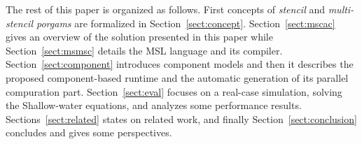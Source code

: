 The rest of this paper is organized as follows. First concepts of \emph{stencil} and \emph{multi-stencil porgams} are formalized in Section~\ref{sect:concept}. Section~\ref{sect:mscac} gives an overview of the solution presented in this paper while Section~\ref{sect:msmsc} details the MSL language and its compiler. Section~\ref{sect:component} introduces component models and then it describes the proposed component-based runtime and the automatic generation of its parallel compuration part.
Section~\ref{sect:eval} focuses on a real-case simulation, solving the Shallow-water equations, and analyzes some performance results. Sections~\ref{sect:related} states on related work, and finally Section~\ref{sect:conclusion} concludes and gives some perspectives.
